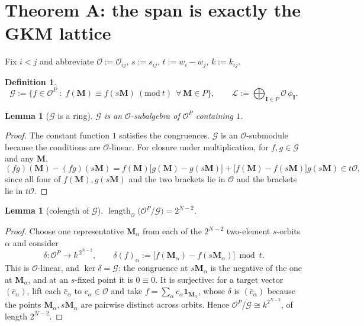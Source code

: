\documentclass[11pt]{article}
\theoremstyle{plain}
\newtheorem{lem}[thm]{Lemma}
\theoremstyle{definition}
\newtheorem{defn}[thm]{Definition}
\theoremstyle{remark}
\theoremstyle{plain}
\newcommand{\bI}{\mathbf{I}}
\newcommand{\bM}{\mathbf{M}}
\newcommand{\Lat}{\mathcal{L}}
\newcommand{\Gkm}{\mathcal{G}}
\begin{document}
\section{Theorem A: the span is exactly the GKM lattice}
\label{sec:thmA}

Fix $i<j$ and abbreviate $\mathcal{O}:=\mathcal{O}_{ij}$, $s:=s_{ij}$,
$t:=w_i-w_j$, $k:=k_{ij}$.

\begin{defn}
\[
  \Gkm:=\bigl\{f\in\mathcal{O}^{P}\;:\;f(\bM)\equiv f(s\bM)\ (\mathrm{mod}\ t)
         \ \ \forall\,\bM\in P\bigr\},
  \qquad
  \Lat:=\bigoplus_{\bI\in P}\mathcal{O}\,\phi_\bI .
\]
\end{defn}

\begin{lem}[$\Gkm$ is a ring]\label{lem:ring}
$\Gkm$ is an $\mathcal{O}$-subalgebra of $\mathcal{O}^{P}$ containing $1$.
\end{lem}

\begin{proof}
The constant function $1$ satisfies the congruences.  $\Gkm$ is an
$\mathcal{O}$-submodule because the conditions are $\mathcal{O}$-linear.  For
closure under multiplication, for $f,g\in\Gkm$ and any $\bM$,
\[
  (fg)(\bM)-(fg)(s\bM)
  = f(\bM)\bigl[g(\bM)-g(s\bM)\bigr]+\bigl[f(\bM)-f(s\bM)\bigr]g(s\bM)
  \in t\mathcal{O},
\]
since all four of $f(\bM),g(s\bM)$ and the two brackets lie in $\mathcal{O}$ and
the brackets lie in $t\mathcal{O}$.
\end{proof}

\begin{lem}[colength of $\Gkm$]\label{lem:colenG}
$\operatorname{length}_{\mathcal{O}}\bigl(\mathcal{O}^{P}/\Gkm\bigr)=2^{N-2}$.
\end{lem}

\begin{proof}
Choose one representative $\bM_\alpha$ from each of the $2^{N-2}$ two-element
$s$-orbits $\alpha$ and consider
\[
   \delta:\mathcal{O}^{P}\longrightarrow k^{\,2^{N-2}},
   \qquad
   \delta(f)_\alpha:=\bigl[f(\bM_\alpha)-f(s\bM_\alpha)\bigr]\bmod t .
\]
This is $\mathcal{O}$-linear, and $\ker\delta=\Gkm$: the congruence at
$s\bM_\alpha$ is the negative of the one at $\bM_\alpha$, and at an $s$-fixed
point it is $0\equiv0$.  It is surjective: for a target vector
$(\bar c_\alpha)$, lift each $\bar c_\alpha$ to $c_\alpha\in\mathcal{O}$ and take
$f=\sum_\alpha c_\alpha\mathbf{1}_{\bM_\alpha}$, whose $\delta$ is
$(\bar c_\alpha)$ because the points $\bM_\alpha,s\bM_\alpha$ are pairwise
distinct across orbits.  Hence
$\mathcal{O}^{P}/\Gkm\cong k^{2^{N-2}}$, of length $2^{N-2}$.
\end{proof}
\end{document}
